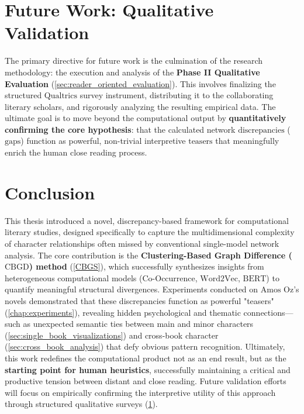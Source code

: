 \documentclass[a4paper,12pt]{report}
\begin{document}
\newpage
\chapter{Future Work: Qualitative Validation}
\label{chap:future_work}

The primary directive for future work is the culmination of the research methodology: the execution and analysis of the \textbf{Phase II Qualitative Evaluation} (\ref{sec:reader_oriented_evaluation}). This involves finalizing the structured $\text{Qualtrics}$ survey instrument, distributing it to the collaborating literary scholars, and rigorously analyzing the resulting empirical data. The ultimate goal is to move beyond the computational output by \textbf{quantitatively confirming the core hypothesis}: that the calculated network $\text{discrepancies}$ ($\text{gaps}$) function as powerful, non-trivial interpretive $\text{teasers}$ that meaningfully enrich the human close reading process.
\chapter{Conclusion}
\label{chap:conclusion}

This thesis introduced a novel, discrepancy-based framework for computational literary studies, designed specifically to capture the multidimensional complexity of character relationships often missed by conventional single-model network analysis. The core contribution is the \textbf{Clustering-Based Graph Difference ($\text{CBGD}$) method} (\ref{CBGS}), which successfully synthesizes insights from heterogeneous computational models ($\text{Co-Occurrence}$, $\text{Word2Vec}$, $\text{BERT}$) to quantify meaningful structural divergences. Experiments conducted on $\text{Amos}$ $\text{Oz}$'s novels demonstrated that these discrepancies function as powerful "teasers" (\ref{chap:experiments}), revealing hidden psychological and thematic connections—such as unexpected semantic ties between main and minor characters (\ref{sec:single_book_visualizations}) and cross-book character (\ref{sec:cross_book_analysis}) that defy obvious pattern recognition. Ultimately, this work redefines the computational product not as an end result, but as the \textbf{starting point for human heuristics}, successfully maintaining a critical and productive tension between distant and close reading. Future validation efforts will focus on empirically confirming the interpretive utility of this approach through structured qualitative surveys (\ref{chap:future_work}).
\end{document}
